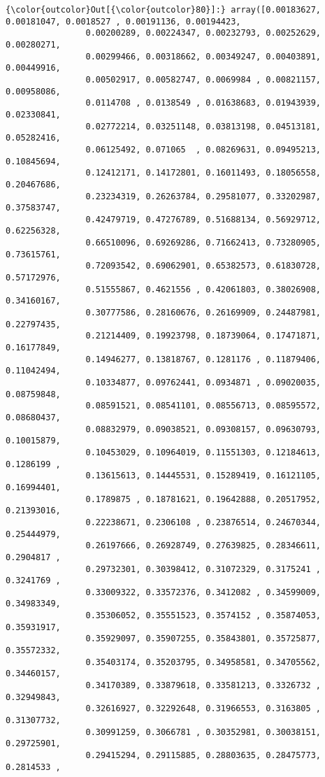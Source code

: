\documentclass[11pt]{article}
\begin{document}
\begin{Verbatim}[commandchars=\\\{\}]
{\color{outcolor}Out[{\color{outcolor}80}]:} array([0.00183627, 0.00181047, 0.0018527 , 0.00191136, 0.00194423,
                0.00200289, 0.00224347, 0.00232793, 0.00252629, 0.00280271,
                0.00299466, 0.00318662, 0.00349247, 0.00403891, 0.00449916,
                0.00502917, 0.00582747, 0.0069984 , 0.00821157, 0.00958086,
                0.0114708 , 0.0138549 , 0.01638683, 0.01943939, 0.02330841,
                0.02772214, 0.03251148, 0.03813198, 0.04513181, 0.05282416,
                0.06125492, 0.071065  , 0.08269631, 0.09495213, 0.10845694,
                0.12412171, 0.14172801, 0.16011493, 0.18056558, 0.20467686,
                0.23234319, 0.26263784, 0.29581077, 0.33202987, 0.37583747,
                0.42479719, 0.47276789, 0.51688134, 0.56929712, 0.62256328,
                0.66510096, 0.69269286, 0.71662413, 0.73280905, 0.73615761,
                0.72093542, 0.69062901, 0.65382573, 0.61830728, 0.57172976,
                0.51555867, 0.4621556 , 0.42061803, 0.38026908, 0.34160167,
                0.30777586, 0.28160676, 0.26169909, 0.24487981, 0.22797435,
                0.21214409, 0.19923798, 0.18739064, 0.17471871, 0.16177849,
                0.14946277, 0.13818767, 0.1281176 , 0.11879406, 0.11042494,
                0.10334877, 0.09762441, 0.0934871 , 0.09020035, 0.08759848,
                0.08591521, 0.08541101, 0.08556713, 0.08595572, 0.08680437,
                0.08832979, 0.09038521, 0.09308157, 0.09630793, 0.10015879,
                0.10453029, 0.10964019, 0.11551303, 0.12184613, 0.1286199 ,
                0.13615613, 0.14445531, 0.15289419, 0.16121105, 0.16994401,
                0.1789875 , 0.18781621, 0.19642888, 0.20517952, 0.21393016,
                0.22238671, 0.2306108 , 0.23876514, 0.24670344, 0.25444979,
                0.26197666, 0.26928749, 0.27639825, 0.28346611, 0.2904817 ,
                0.29732301, 0.30398412, 0.31072329, 0.3175241 , 0.3241769 ,
                0.33009322, 0.33572376, 0.3412082 , 0.34599009, 0.34983349,
                0.35306052, 0.35551523, 0.3574152 , 0.35874053, 0.35931917,
                0.35929097, 0.35907255, 0.35843801, 0.35725877, 0.35572332,
                0.35403174, 0.35203795, 0.34958581, 0.34705562, 0.34460157,
                0.34170389, 0.33879618, 0.33581213, 0.3326732 , 0.32949843,
                0.32616927, 0.32292648, 0.31966553, 0.3163805 , 0.31307732,
                0.30991259, 0.3066781 , 0.30352981, 0.30038151, 0.29725901,
                0.29415294, 0.29115885, 0.28803635, 0.28475773, 0.2814533 ,

\end{Verbatim}
\end{document}
